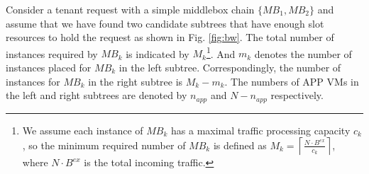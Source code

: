 \documentclass[review]{elsarticle}
\begin{document}
Consider a tenant request with a simple middlebox chain $\{MB_1, MB_2\}$ and assume that we have found two candidate subtrees that have enough slot resources to hold the request 
as shown in Fig. \ref{fig:bw}. %
The total number of instances required by $MB_k$ is indicated by $M_k$\footnote{We assume each instance of $MB_k$ has a maximal traffic processing capacity $c_k$, so the minimum required number of $MB_k$ is defined as 
	$M_{k}={\left\lceil\frac{N \cdot B^{ex}}{c_{k}}\right\rceil}$,
	where $N\cdot B^{ex}$ is the total incoming traffic.}. And $m_k$ denotes the number of instances placed for $MB_k$  in the left subtree. %
 Correspondingly, the number of instances for $MB_k$ in the right subtree is $M_k-m_k$. The numbers of APP VMs in the left and right subtrees are denoted by $n_{app}$ and $N-n_{app}$ respectively. %
\end{document}
